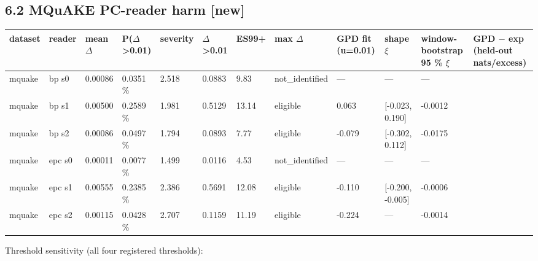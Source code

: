 \documentclass[10pt,a4paper]{article}
\begin{document}
\subsection*{6.2 MQuAKE PC-reader harm [new]}



\begin{center}\tiny
\begin{tabularx}{\textwidth}{@{}p{}XXXXXXXXXXX@{}}
\toprule
dataset & reader & mean $\Delta$ & P($\Delta$>0.01) & severity & $\Delta$>0.01 & ES99+ & max $\Delta$ & GPD fit (u=0.01) & shape $\xi$ & window-bootstrap 95 \% $\xi$ & GPD $-$ exp (held-out nats/excess) \\ \midrule
mquake & bp s0 & 0.00086 & 0.0351 \% & 2.518 & 0.0883 & 9.83 & not\_identified & — & — & — &  \\
mquake & bp s1 & 0.00500 & 0.2589 \% & 1.981 & 0.5129 & 13.14 & eligible & 0.063 & [-0.023, 0.190] & -0.0012 &  \\
mquake & bp s2 & 0.00086 & 0.0497 \% & 1.794 & 0.0893 & 7.77 & eligible & -0.079 & [-0.302, 0.112] & -0.0175 &  \\
mquake & epc s0 & 0.00011 & 0.0077 \% & 1.499 & 0.0116 & 4.53 & not\_identified & — & — & — &  \\
mquake & epc s1 & 0.00555 & 0.2385 \% & 2.386 & 0.5691 & 12.08 & eligible & -0.110 & [-0.200, -0.005] & -0.0006 &  \\
mquake & epc s2 & 0.00115 & 0.0428 \% & 2.707 & 0.1159 & 11.19 & eligible & -0.224 & — & -0.0014 &  \\
\bottomrule
\end{tabularx}
\end{center}



Threshold sensitivity (all four registered thresholds):
\end{document}
